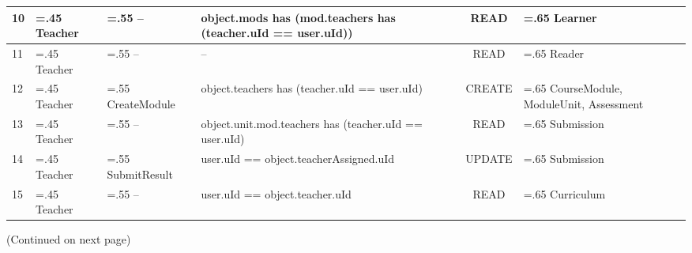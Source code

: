 \begin{landscape}
\begin{table}[!ht]
\begin{tabularx}{24cm}{l>{\hsize=.45\hsize}X>{\hsize=.55\hsize}X>{\hsize=0.9\hsize}Xc>{\hsize=.65\hsize}X}
			\midrule
			10  & Teacher                  & --                & object.mods has (mod.teachers has (teacher.uId == user.uId))   & READ           & Learner                              \\
			\midrule
			11 & Teacher                  & --                & --                                                             & READ           & Reader                               \\
			\midrule
			12 & Teacher                  & CreateModule      & object.teachers has \newline(teacher.uId == user.uId)          & CREATE         & CourseModule, ModuleUnit, Assessment \\
			\midrule
			13 & Teacher                  & --                & object.unit.mod.teachers has \newline(teacher.uId == user.uId) & READ           & Submission                           \\
			\midrule
			14 & Teacher                  & SubmitResult      & user.uId == object.teacherAssigned.uId                         & UPDATE         & Submission                           \\
			\midrule
			15 & Teacher                  & --                & user.uId == object.teacher.uId                                 & READ           & Curriculum                           \\
			\bottomrule
		\end{tabularx}
	\end{table}
	(Continued on next page)
\end{landscape}
	
